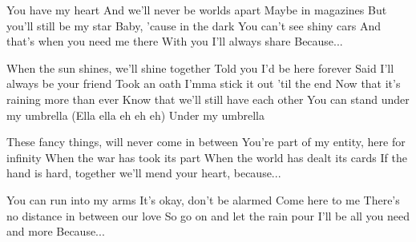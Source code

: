\begin{verse*}
You have my heart
And we'll never be worlds apart
Maybe in magazines
But you'll still be my star
Baby, 'cause in the dark
You can't see shiny cars
And that's when you need me there
With you I'll always share
Because...
\end{verse*}

\begin{chorus}
When the sun shines, we'll shine together
Told you I'd be here forever
Said I'll always be your friend
Took an oath I'mma stick it out 'til the end
Now that it's raining more than ever
Know that we'll still have each other
You can stand under my umbrella 
(Ella ella eh eh eh)
Under my umbrella 
\end{chorus}

\begin{verse*}
These fancy things,
will never come in between
You're part of my entity, here for infinity
When the war has took its part
When the world has dealt its cards
If the hand is hard,
together we'll mend your heart, because...
\end{verse*}

\thechorus

\begin{verse*}
You can run into my arms
It's okay, don't be alarmed
Come here to me
There's no distance in between our love
So go on and let the rain pour
I'll be all you need and more
Because...
\end{verse*}

\thechorus
